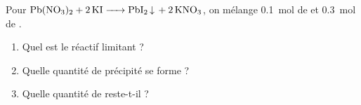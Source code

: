 \documentclass[11pt,a4paper]{article}
\begin{document}
\begin{exo}
Pour $\ce{Pb(NO3)2 + 2 KI -> PbI2 v + 2 KNO3}$, on mélange \qty{0.1}{\mole} de  et
\qty{0.3}{\mole} de .
\begin{enumerate}[label=\alph*)]
  \item Quel est le réactif limitant ?
  \item Quelle quantité de précipité  se forme ?
  \item Quelle quantité de  reste-t-il ?
\end{enumerate}
\end{exo}
\end{document}
